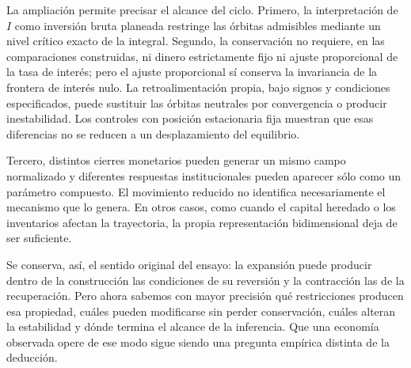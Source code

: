 \documentclass[10.5pt,twoside]{article}
\begin{document}
La ampliación permite precisar el alcance del ciclo. Primero, la interpretación de $I$ como inversión bruta planeada restringe las órbitas admisibles mediante un nivel crítico exacto de la integral. Segundo, la conservación no requiere, en las comparaciones construidas, ni dinero estrictamente fijo ni ajuste proporcional de la tasa de interés; pero el ajuste proporcional sí conserva la invariancia de la frontera de interés nulo. La retroalimentación propia, bajo signos y condiciones especificados, puede sustituir las órbitas neutrales por convergencia o producir inestabilidad. Los controles con posición estacionaria fija muestran que esas diferencias no se reducen a un desplazamiento del equilibrio.

Tercero, distintos cierres monetarios pueden generar un mismo campo normalizado y diferentes respuestas institucionales pueden aparecer sólo como un parámetro compuesto. El movimiento reducido no identifica necesariamente el mecanismo que lo genera. En otros casos, como cuando el capital heredado o los inventarios afectan la trayectoria, la propia representación bidimensional deja de ser suficiente.

Se conserva, así, el sentido original del ensayo: la expansión puede producir dentro de la construcción las condiciones de su reversión y la contracción las de la recuperación. Pero ahora sabemos con mayor precisión qué restricciones producen esa propiedad, cuáles pueden modificarse sin perder conservación, cuáles alteran la estabilidad y dónde termina el alcance de la inferencia. Que una economía observada opere de ese modo sigue siendo una pregunta empírica distinta de la deducción.
\end{document}

